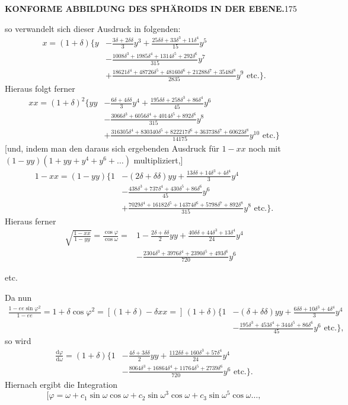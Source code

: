 \par\clearpage
\noindent\null\hfill{\small\textbf{KONFORME ABBILDUNG DES SPHÄROIDS IN DER EBENE.}}\hfill175\par\medskip
\noindent so verwandelt sich dieser Ausdruck in folgenden:
\[
\begin{aligned}
x=(1+\delta)\biggl\{y&-\frac{3\delta+2\delta\delta}{3}y^3+\frac{25\delta\delta+33\delta^3+11\delta^4}{15}y^5\\
&-\frac{1008\delta^3+1985\delta^4+1314\delta^5+292\delta^6}{315}y^7\\
&+\frac{18621\delta^4+48726\delta^5+48160\delta^6+21288\delta^7+3548\delta^8}{2835}y^9\text{ etc.}\biggr\}.
\end{aligned}
\]
Hieraus folgt ferner
\[
\begin{aligned}
xx=(1+\delta)^2\biggl\{yy&-\frac{6\delta+4\delta\delta}{3}y^4+\frac{195\delta\delta+258\delta^3+86\delta^4}{45}y^6\\
&-\frac{3066\delta^3+6056\delta^4+4014\delta^5+892\delta^6}{315}y^8\\
&+\frac{316305\delta^4+830340\delta^5+822217\delta^6+363738\delta^7+60623\delta^8}{14175}y^{10}\text{ etc.}\biggr\}
\end{aligned}
\]
[und, indem man den daraus sich ergebenden Ausdruck für \(1-xx\) noch mit \((1-yy)(1+yy+y^4+y^6+\ldots)\) multipliziert,]
\[
\begin{aligned}
1-xx=(1-yy)\biggl\{1&-(2\delta+\delta\delta)yy+\frac{13\delta\delta+14\delta^3+4\delta^4}{3}y^4\\
&-\frac{438\delta^3+737\delta^4+430\delta^5+86\delta^6}{45}y^6\\
&+\frac{7029\delta^4+16182\delta^5+14374\delta^6+5798\delta^7+892\delta^8}{315}y^8\text{ etc.}\biggr\}.
\end{aligned}
\]
Hieraus ferner
\[
\begin{aligned}
\sqrt{\frac{1-xx}{1-yy}}=\frac{\cos\varphi}{\cos\omega}={}&1-\frac{2\delta+\delta\delta}{2}yy+\frac{40\delta\delta+44\delta^3+13\delta^4}{24}y^4\\
&-\frac{2304\delta^3+3976\delta^4+2390\delta^5+493\delta^6}{720}y^6
\end{aligned}
\]
{\centering etc.\par}
Da nun
\[
\begin{aligned}
\frac{1-ee\sin\varphi^2}{1-ee}=1+\delta\cos\varphi^2=[(1+\delta)-\delta xx={}]\,(1+\delta)\biggl\{1&-(\delta+\delta\delta)yy+\frac{6\delta\delta+10\delta^3+4\delta^4}{3}y^4\\
&-\frac{195\delta^3+453\delta^4+344\delta^5+86\delta^6}{45}y^6\text{ etc.}\biggr\},
\end{aligned}
\]
\noindent so wird
\[
\begin{aligned}
\frac{\mathrm d\varphi}{\mathrm d\omega}=(1+\delta)\biggl\{1&-\frac{4\delta+3\delta\delta}{2}yy+\frac{112\delta\delta+160\delta^3+57\delta^4}{24}y^4\\
&-\frac{8064\delta^3+16864\delta^4+11764\delta^5+2739\delta^6}{720}y^6\text{ etc.}\biggr\}.
\end{aligned}
\]
Hiernach ergibt die Integration
\[ [\varphi=\omega+c_1\sin\omega\cos\omega+c_2\sin\omega^3\cos\omega+c_3\sin\omega^5\cos\omega\ldots,\]

